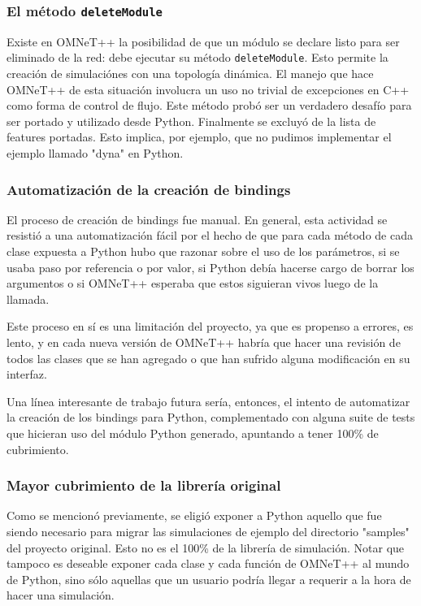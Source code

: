 \documentclass[]{article}
\begin{document}
\subsubsection{El método \texttt{deleteModule}}

Existe en OMNeT++ la posibilidad de que un módulo se declare listo para ser
eliminado de la red: debe ejecutar su método \verb!deleteModule!. Esto permite la
creación de simulaciónes con una topología dinámica. El manejo que hace OMNeT++
de esta situación involucra un uso no trivial de excepciones en C++ como forma
de control de flujo. Este método probó ser un verdadero desafío para ser
portado y utilizado desde Python. Finalmente se excluyó de la lista de features
portadas. Esto implica, por ejemplo, que no pudimos implementar el ejemplo
llamado "dyna" en Python.

\subsubsection{Automatización de la creación de bindings}
El proceso de creación de bindings fue manual. En general, esta actividad se
resistió a una automatización fácil por el hecho de que para cada método de
cada clase expuesta a Python hubo que razonar sobre el uso de los parámetros,
si se usaba paso por referencia o por valor, si Python debía hacerse cargo de
borrar los argumentos o si OMNeT++ esperaba que estos siguieran vivos luego de
la llamada.

Este proceso en sí es una limitación del proyecto, ya que es propenso a
errores, es lento, y en cada nueva versión de OMNeT++ habría que hacer una
revisión de todos las clases que se han agregado o que han sufrido alguna
modificación en su interfaz.

Una línea interesante de trabajo futura sería, entonces, el intento de
automatizar la creación de los bindings para Python, complementado con alguna
suite de tests que hicieran uso del módulo Python generado, apuntando a tener
100\% de cubrimiento.

\subsubsection{Mayor cubrimiento de la librería original}
Como se mencionó previamente, se eligió exponer a Python aquello que fue siendo
necesario para migrar las simulaciones de ejemplo del directorio "samples" del
proyecto original. Esto no es el 100\% de la librería de simulación. Notar que
tampoco es deseable exponer cada clase y cada función de OMNeT++ al mundo de
Python, sino sólo aquellas que un usuario podría llegar a requerir a la hora de
hacer una simulación.
\end{document}

